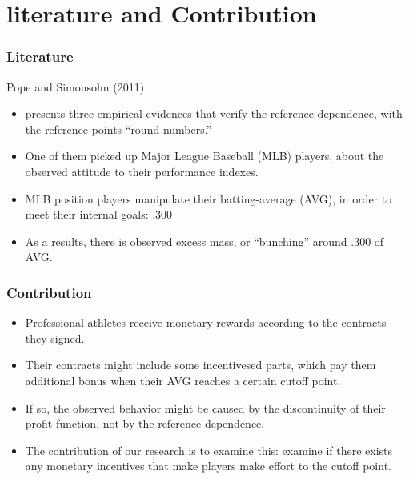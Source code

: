 \documentclass[dvipdfmx,12pt]{beamer}
\begin{document}
\section{literature and Contribution}
\begin{frame}\frametitle{Literature}
  Pope and Simonsohn (2011)
  \begin{itemize}
    \item presents three empirical evidences that verify the reference dependence, with the reference points ``round numbers.''

    \item One of them picked up Major League Baseball (MLB) players, about the observed attitude to their performance indexes.

    \item MLB position players manipulate their batting-average (AVG), in order to meet their internal goals: .300

    \item As a results, there is observed excess mass, or ``bunching'' around .300 of AVG.
  \end{itemize}
\end{frame}

\begin{frame}\frametitle{Contribution}
\begin{itemize}
  \item Professional athletes receive monetary rewards according to the contracts they signed.

  \item Their contracts might include some incentivesed parts, which pay them additional bonus when their AVG reaches a certain cutoff point.

  \item If so, the observed behavior might be caused by the discontinuity of their profit function, not by the reference dependence.

  \item The contribution of our research is to examine this: examine if there exists any monetary incentives that make players make effort to the cutoff point.
\end{itemize}
\end{frame}
\end{document}
